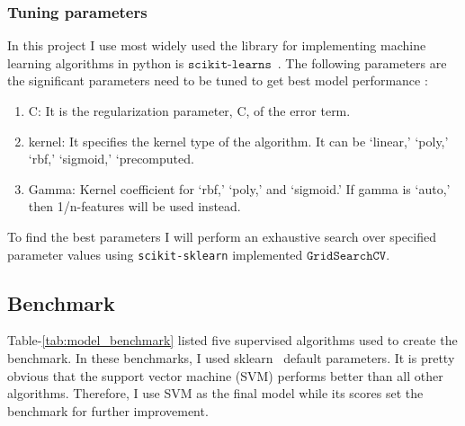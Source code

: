 \documentclass[12pt]{article}
\begin{document}
        \subsubsection{Tuning parameters}
        
        In this project I use most widely used the library for implementing machine learning algorithms in python is $\texttt{scikit-learns}$~\citep{scikit-learn}. The following parameters are the significant parameters  need to be tuned to get best model performance :
        
        \begin{enumerate}
            \item C:  It is the regularization parameter, C, of the error term.
            \item kernel: It specifies the kernel type of the algorithm. It can be ‘linear,' ‘poly,' ‘rbf,' ‘sigmoid,' ‘precomputed.
            \item Gamma: Kernel coefficient for ‘rbf,' ‘poly,' and ‘sigmoid.' If gamma is ‘auto,' then 1/n-features will be used instead.
        \end{enumerate}
        
        To find the best parameters I will perform an exhaustive search over specified parameter values using \texttt{scikit-sklearn} implemented $\texttt{GridSearchCV}$. 
        
        \subsection{Benchmark}
        Table-\ref{tab:model_benchmark} listed five supervised algorithms used to create the benchmark. In these benchmarks, I used sklearn~\citep{scikit-learn} default parameters. It is pretty obvious that the support vector machine (SVM) performs better than all other algorithms. Therefore, I use SVM as the final model while its scores set the benchmark for further improvement.
        
\end{document}
